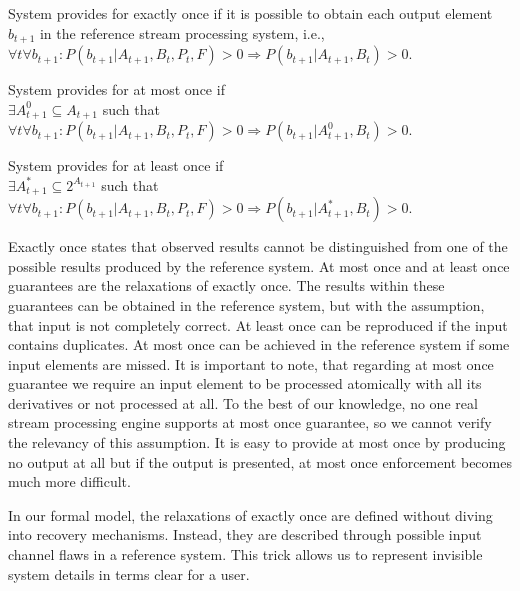 \begin{definition}{System provides for exactly once}
if it is possible to obtain each output element $b_{t+1}$ in the reference stream processing system, i.e.,\\ 
$\forall{t} \forall{b_{t+1}}: P(b_{t+1}|A_{t+1},B_t,P_t,F)>0 \Rightarrow P(b_{t+1}|A_{t+1},B_t)>0$.
\end{definition}

\begin{definition}{System provides for at most once}
if \\
$\exists{A^{0}_{t+1}\subseteq{A_{t+1}}}$ such that \\
$\forall{t} \forall{b_{t+1}}: P(b_{t+1}|A_{t+1},B_t,P_t,F)>0 \Rightarrow P(b_{t+1}|A^{0}_{t+1},B_t)>0$.
\end{definition}

\begin{definition}{System provides for at least once}
if \\
$\exists{A^{*}_{t+1}\subseteq{2^{A_{t+1}}}}$ such that \\
$\forall{t} \forall{b_{t+1}}: P(b_{t+1}|A_{t+1},B_t,P_t,F)>0 \Rightarrow P(b_{t+1}|A^{*}_{t+1},B_t)>0$.
\end{definition}

Exactly once states that observed results cannot be distinguished from one of the possible results produced by the reference system. At most once and at least once guarantees are the relaxations of exactly once. The results within these guarantees can be obtained in the reference system, but with the assumption, that input is not completely correct. At least once can be reproduced if the input contains duplicates. At most once can be achieved in the reference system if some input elements are missed. It is important to note, that regarding at most once guarantee we require an input element to be processed atomically with all its derivatives or not processed at all. To the best of our knowledge, no one real stream processing engine supports at most once guarantee, so we cannot verify the relevancy of this assumption. It is easy to provide at most once by producing no output at all but if the output is presented, at most once enforcement becomes much more difficult.  

In our formal model, the relaxations of exactly once are defined without diving into recovery mechanisms. Instead, they are described through possible input channel flaws in a reference system. This trick allows us to represent invisible system details in terms clear for a user.

